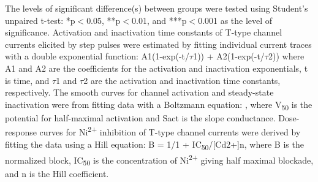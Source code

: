 The levels of significant difference(s) between groups were tested using Student's unpaired t-test: *p$<$0.05, **p$<$0.01, and ***p$<$0.001 as the level of significance.
Activation and inactivation time constants of T-type channel currents elicited by step pulses were estimated by fitting individual current traces with a double exponential function: A1(1-exp(-t/$\tau$1)) + A2(1-exp(-t/$\tau$2)) where A1 and A2 are the coefficients for the activation and inactivation exponentials, t is time, and $\tau$1 and $\tau$2 are the activation and inactivation time constants, respectively.
The smooth curves for channel activation and steady-state inactivation were from fitting data with a Boltzmann equation: , where V\textsubscript{50} is the potential for half-maximal activation and Sact is the slope conductance.
Dose-response curves for Ni\textsuperscript{2+} inhibition of T-type channel currents were derived by fitting the data using a Hill equation: B = 1/{1 + IC\textsubscript{50}/[Cd2+]n}, where B is the normalized block, IC\textsubscript{50} is the concentration of Ni\textsuperscript{2+} giving half maximal blockade, and n is the Hill coefficient.
    
  
  
  